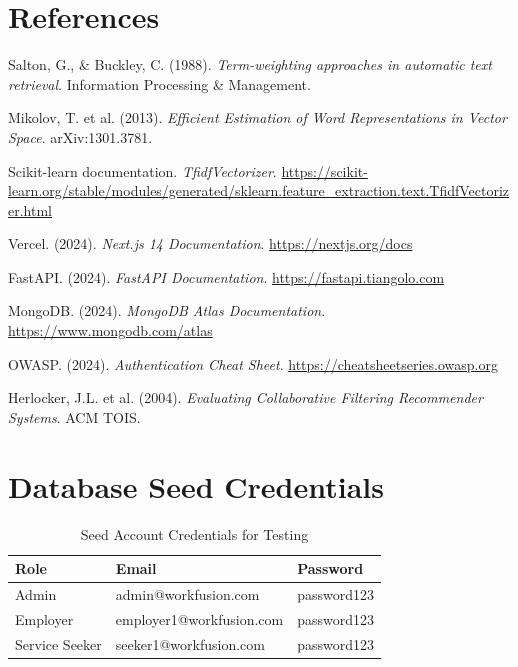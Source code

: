 \documentclass[12pt,a4paper,oneside]{report}
\begin{document}
\chapter*{References}

\begin{enumerate}[label={[\arabic*]}]
  \item Salton, G., \& Buckley, C. (1988). \textit{Term-weighting approaches in automatic text retrieval}. Information Processing \& Management.
  \item Mikolov, T. et al. (2013). \textit{Efficient Estimation of Word Representations in Vector Space}. arXiv:1301.3781.
  \item Scikit-learn documentation. \textit{TfidfVectorizer}. \url{https://scikit-learn.org/stable/modules/generated/sklearn.feature_extraction.text.TfidfVectorizer.html}
  \item Vercel. (2024). \textit{Next.js 14 Documentation}. \url{https://nextjs.org/docs}
  \item FastAPI. (2024). \textit{FastAPI Documentation}. \url{https://fastapi.tiangolo.com}
  \item MongoDB. (2024). \textit{MongoDB Atlas Documentation}. \url{https://www.mongodb.com/atlas}
  \item OWASP. (2024). \textit{Authentication Cheat Sheet}. \url{https://cheatsheetseries.owasp.org}
  \item Herlocker, J.L. et al. (2004). \textit{Evaluating Collaborative Filtering Recommender Systems}. ACM TOIS.
\end{enumerate}

\appendix

\chapter{Database Seed Credentials}
\label{app:seed}

\begin{table}[H]
  \centering
  \caption{Seed Account Credentials for Testing}
  \begin{tabular}{lll}
    \toprule
    \textbf{Role} & \textbf{Email} & \textbf{Password} \\
    \midrule
    Admin          & admin@workfusion.com    & password123 \\
    Employer       & employer1@workfusion.com & password123 \\
    Service Seeker & seeker1@workfusion.com  & password123 \\
    \bottomrule
  \end{tabular}
\end{table}
\end{document}
